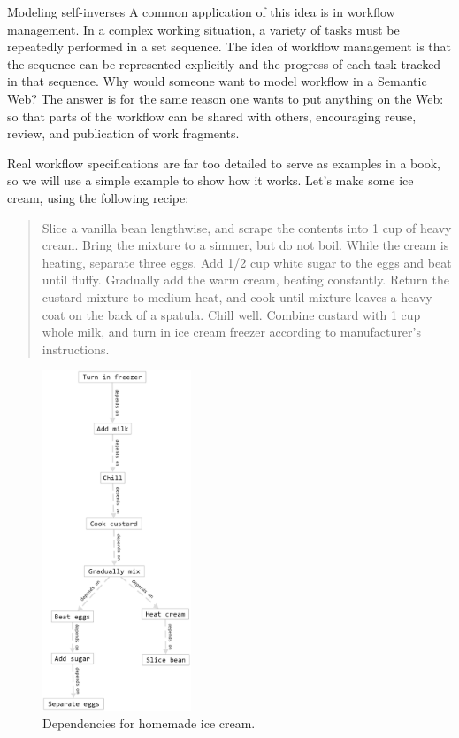 \begin{challenge}{Modeling self-inverses}
A common application of this idea is in workflow management. In a
complex working situation, a variety of tasks must be repeatedly
performed in a set sequence. The idea of workflow management is that the
sequence can be represented explicitly and the progress of each task
tracked in that sequence. Why would someone want to model workflow in a
Semantic Web? The answer is for the same reason one wants to put
anything on the Web: so that parts of the workflow can be shared with
others, encouraging reuse, review, and publication of work fragments.

Real workflow specifications are far too detailed to serve as examples
in a book, so we will use a simple example to show how it works. Let's
make some ice cream, using the following recipe:


\begin{quote}
Slice a vanilla bean lengthwise, and scrape the contents into 1 cup of
heavy cream. Bring the mixture to a simmer, but do not boil. While the
cream is heating, separate three eggs. Add 1/2 cup white sugar to the
eggs and beat until fluffy. Gradually add the warm cream, beating
constantly. Return the custard mixture to medium heat, and cook until
mixture leaves a heavy coat on the back of a spatula. Chill well. Combine custard with 1 cup whole milk, and turn in ice cream freezer according to manufacturer's instructions.
\end{quote}



\begin{figure}
\centering
\includegraphics[height=4in]{SWWOv3/media/ch9/figure9-6.png}
\caption{Dependencies for homemade ice cream.}
\label{fig:ch9.6}
\end{figure}



\end{challenge}
